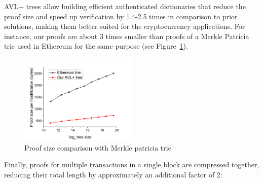 AVL+ trees allow building efficient authenticated dictionaries that reduce the proof size and speed up verification by 1.4-2.5 times in comparison to prior solutions, making them better suited for the cryptocurrency applications.
For instance, our proofs are about 3 times smaller than proofs of a Merkle Patricia trie used in Ethereum for the same purpose (see Figure~\ref{fig:proofSize}).

\begin{figure}[H]
    \centering
    \includegraphics[width=0.5\textwidth]{img/proofSize.png}
    \caption{Proof size comparison with Merkle patricia trie
    \label{fig:proofSize} }
\end{figure}

Finally, proofs for multiple transactions in a single block are compressed together, reducing their total length
by approximately an additional factor of 2:

